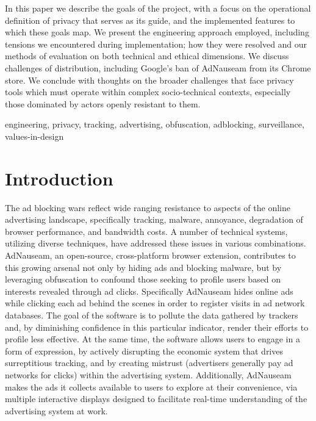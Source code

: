 \documentclass[conference]{IEEEtran}
\begin{document}
In this paper we describe the goals of the project, with a focus on the operational definition of privacy that serves as its guide, and the implemented features to which these goals map. We present the engineering approach employed, including tensions we encountered during implementation; how they were resolved and our methods of evaluation on both technical and ethical dimensions. We discuss challenges of distribution, including Google's ban of AdNauseam from its Chrome store. We conclude with thoughts on the broader challenges that face privacy tools which must operate within complex socio-technical contexts, especially those dominated by actors openly resistant to them.

\vspace{5mm}

\begin{IEEEkeywords}
engineering, privacy, tracking, advertising, obfuscation, adblocking, surveillance, values-in-design
\end{IEEEkeywords}

\IEEEpeerreviewmaketitle

\section{Introduction}

The ad blocking wars \cite{Nytimes} reflect wide ranging resistance to aspects of the online advertising landscape, specifically tracking, malware, annoyance, degradation of browser performance, and bandwidth costs. A number of technical systems, utilizing diverse techniques, have addressed these issues in various combinations. AdNauseam, an open-source, cross-platform browser extension, contributes to this growing arsenal not only by hiding ads and blocking malware, but by leveraging obfuscation to confound those seeking to profile users based on interests revealed through ad clicks. Specifically AdNauseam hides online ads while clicking each ad behind the scenes in order to register visits in ad network databases. The goal of the software is to pollute the data gathered by trackers and, by diminishing confidence in this particular indicator, render their efforts to profile less effective. At the same time, the software allows users to engage in a form of expression, by actively disrupting the economic system that drives surreptitious tracking, and by creating mistrust (advertisers generally pay ad networks for clicks) within the advertising system. Additionally, AdNauseam makes the ads it collects available to users to explore at their convenience, via multiple interactive displays designed to facilitate real-time understanding of the advertising system at work.
\end{document}
